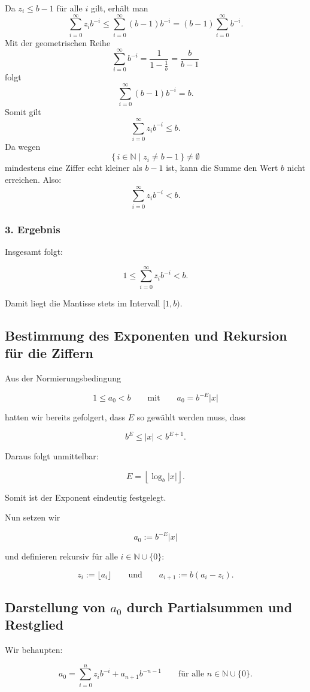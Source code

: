 \documentclass{article}
\newcommand{\N}{\mathbb{N}}
\begin{document}
Da \(z_i\leq b-1\) für alle \(i\) gilt, erhält man
\[
\sum_{i=0}^{\infty} z_i b^{-i}
\leq
\sum_{i=0}^{\infty}(b-1)b^{-i}
=
(b-1)\sum_{i=0}^{\infty}b^{-i}.
\]
Mit der geometrischen Reihe
\[
\sum_{i=0}^{\infty}b^{-i}
=
\frac{1}{1-\frac1b}
=
\frac{b}{b-1}
\]
folgt
\[
\sum_{i=0}^{\infty}(b-1)b^{-i}=b.
\]
Somit gilt
\[
\sum_{i=0}^{\infty} z_i b^{-i}\leq b.
\]
Da wegen
\[
\{\,i\in\N\mid z_i\neq b-1\,\}\neq\emptyset
\]
mindestens eine Ziffer echt kleiner als \(b-1\) ist, kann die Summe den Wert \(b\) nicht erreichen. Also:
\[
\sum_{i=0}^{\infty} z_i b^{-i}<b.
\]
\subsubsection*{3. Ergebnis}

Insgesamt folgt:

\[
1\leq \sum_{i=0}^{\infty} z_i b^{-i}<b.
\]

Damit liegt die Mantisse stets im Intervall \([1,b)\).

\subsection*{Bestimmung des Exponenten und Rekursion für die Ziffern}

Aus der Normierungsbedingung

\[
1\leq a_0<b
\qquad\text{mit}\qquad
a_0=b^{-E}|x|
\]

hatten wir bereits gefolgert, dass \(E\) so gewählt werden muss, dass

\[
b^E\leq |x|<b^{E+1}.
\]

Daraus folgt unmittelbar:

\[
E=\left\lfloor \log_b |x| \right\rfloor.
\]

Somit ist der Exponent eindeutig festgelegt.

Nun setzen wir

\[
a_0:=b^{-E}|x|
\]

und definieren rekursiv für alle \(i\in\mathbb{N}\cup\{0\}\):

\[
z_i:=\lfloor a_i\rfloor
\qquad\text{und}\qquad
a_{i+1}:=b(a_i-z_i).
\]

\subsection*{Darstellung von \(a_0\) durch Partialsummen und Restglied}

Wir behaupten:

\[
a_0=
\sum_{i=0}^{n} z_i b^{-i}
+
a_{n+1}b^{-n-1}
\qquad
\text{für alle } n\in\mathbb{N}\cup\{0\}.
\]
\end{document}
